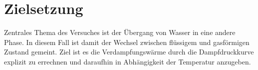 \section{Zielsetzung}

Zentrales Thema des Versuches ist der Übergang von Wasser in eine andere Phase.
In diesem Fall ist damit der Wechsel zwischen flüssigem und gasförmigen Zustand gemeint.
Ziel ist es die Verdampfungswärme durch die Dampfdruckkurve explizit zu errechnen und daraufhin in Abhängigkeit der Temperatur anzugeben.